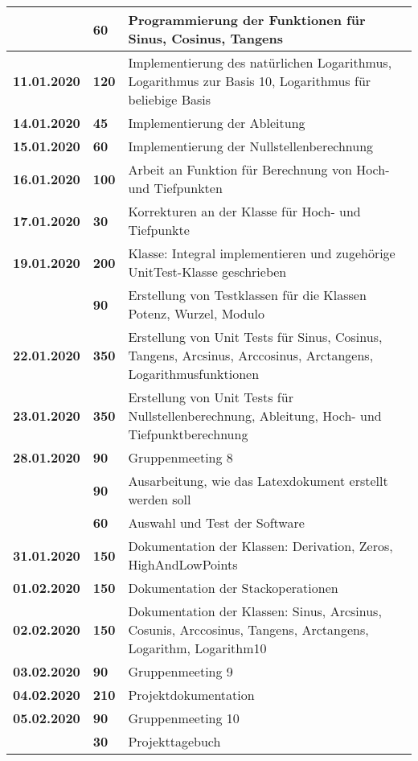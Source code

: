 {{\begin{longtable}{|l|l|p{11cm}|}
		& \textbf{\hfill 60} & Programmierung der Funktionen für Sinus, Cosinus, Tangens
		\\ \hline \textbf{11.01.2020}
		& \textbf{\hfill 120} & Implementierung des natürlichen Logarithmus, Logarithmus zur Basis 10, Logarithmus für beliebige Basis
		\\ \hline \textbf{14.01.2020}
		& \textbf{\hfill 45} & Implementierung der Ableitung
		\\ \hline \textbf{15.01.2020}
		& \textbf{\hfill 60} & Implementierung der Nullstellenberechnung
		\\ \hline \textbf{16.01.2020}
		& \textbf{\hfill 100} & Arbeit an Funktion für Berechnung von Hoch- und Tiefpunkten
		\\ \hline \textbf{17.01.2020}
		& \textbf{\hfill 30} & Korrekturen an der Klasse für Hoch- und Tiefpunkte
		\\ \hline \textbf{19.01.2020}
		& \textbf{\hfill 200} & Klasse: Integral implementieren und zugehörige UnitTest-Klasse geschrieben \\\cline{2-3}
		& \textbf{\hfill 90} & Erstellung von Testklassen für die Klassen Potenz, Wurzel, Modulo
		\\ \hline \textbf{22.01.2020}
		& \textbf{\hfill 350} & Erstellung von Unit Tests für Sinus, Cosinus, Tangens, Arcsinus, Arccosinus, Arctangens, Logarithmusfunktionen
		\\ \hline \textbf{23.01.2020}
		& \textbf{\hfill 350} & Erstellung von Unit Tests für Nullstellenberechnung, Ableitung, Hoch- und Tiefpunktberechnung
		\\ \hline \textbf{28.01.2020}
		& \textbf{\hfill 90} & Gruppenmeeting 8 \\\cline{2-3}
		& \textbf{\hfill 90} & Ausarbeitung, wie das Latexdokument erstellt werden soll  \\\cline{2-3}
		& \textbf{\hfill 60} & Auswahl und Test der Software
		\\ \hline \textbf{31.01.2020}
		& \textbf{\hfill 150} & Dokumentation der Klassen: Derivation, Zeros, HighAndLowPoints
		\\ \hline \textbf{01.02.2020}
		& \textbf{\hfill 150} & Dokumentation der Stackoperationen
		\\ \hline \textbf{02.02.2020}
		& \textbf{\hfill 150} & Dokumentation der Klassen: Sinus, Arcsinus, Cosunis, Arccosinus, Tangens, Arctangens, Logarithm, Logarithm10
		\\ \hline \textbf{03.02.2020}
		& \textbf{\hfill 90} & Gruppenmeeting 9
		\\ \hline \textbf{04.02.2020}
		& \textbf{\hfill 210} & Projektdokumentation
		\\ \hline \textbf{05.02.2020}
		& \textbf{\hfill 90} & Gruppenmeeting 10 \\\cline{2-3}
		& \textbf{\hfill 30} & Projekttagebuch  
		\\ \hline
	\end{longtable}
}

}
